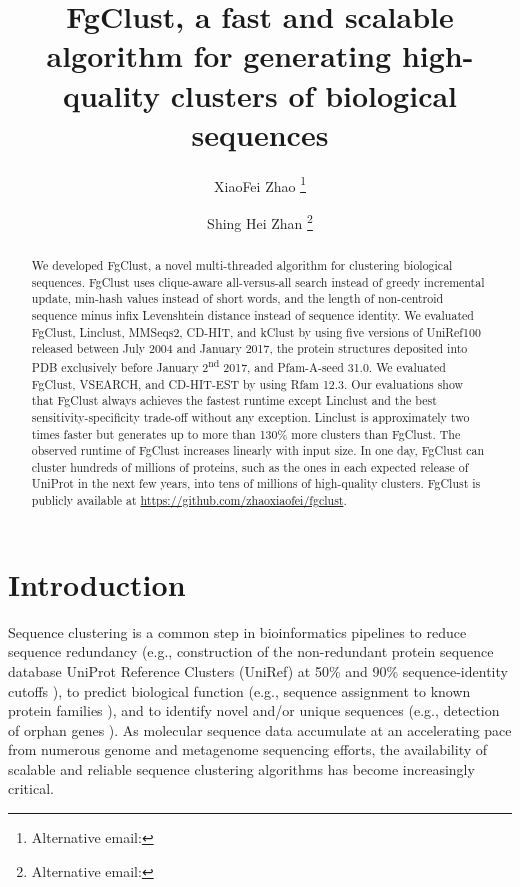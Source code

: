 \documentclass[11pt,letterpaper]{llncs2e/llncs}
\title{FgClust, a fast and scalable algorithm for generating high-quality clusters of biological sequences}
\author{
	XiaoFei Zhao
	\inst{1}\thanks{Alternative email: \email{cndfeifei@gmail.com}}
	\and
	Shing Hei Zhan
	\inst{2}\thanks{Alternative email: \email{shing.zhan@gmail.com}}
}
\institute{
	Fusion Genomics Corporation,
	\email{xzhao@fusiongenomics.com}
	\and
	Fusion Genomics Corporation,
	\email{szhan@fusiongenomics.com}
}
\begin{document}
\maketitle{}

\begin{abstract}
We developed FgClust, a novel multi-threaded algorithm for clustering biological sequences.
FgClust uses clique-aware all-versus-all search instead of greedy incremental update, min-hash values instead of short words, and the length of non-centroid sequence minus infix Levenshtein distance instead of sequence identity.
We evaluated FgClust, Linclust, MMSeqs2, CD-HIT, and kClust by using
five versions of UniRef100 released between July 2004 and January 2017, 
the protein structures deposited into PDB exclusively before January 2\textsuperscript{nd} 2017, and Pfam-A-seed 31.0.
We evaluated FgClust, VSEARCH, and CD-HIT-EST by using Rfam 12.3.
Our evaluations show that FgClust always achieves the fastest runtime except Linclust and the best sensitivity-specificity trade-off without any exception.
Linclust is approximately two times faster but generates up to more than 130\% more clusters than FgClust.
The observed runtime of FgClust increases linearly with input size.
In one day, FgClust can cluster hundreds of millions of proteins, such as the ones in each expected release of UniProt in the next few years, into tens of millions of high-quality clusters.
FgClust is publicly available at \url{https://github.com/zhaoxiaofei/fgclust}.
\end{abstract}

\clearpage{}

\section{Introduction}

Sequence clustering is a common step in bioinformatics pipelines to reduce sequence redundancy (e.g., construction of the non-redundant protein sequence database UniProt Reference Clusters (UniRef) at 50\% and 90\% sequence-identity cutoffs \citep{suzek2007uniref}), to predict biological function (e.g., sequence assignment to known protein families \citep{finn2016pfam}), and to identify novel and/or unique sequences (e.g., detection of orphan genes \citep{prabh2016orphan}). As molecular sequence data accumulate at an accelerating pace from numerous genome and metagenome sequencing efforts, the availability of scalable and reliable sequence clustering algorithms has become increasingly critical.
\end{document}
